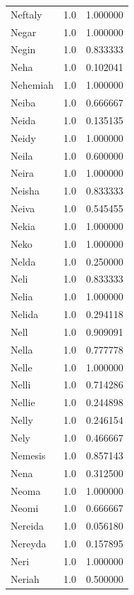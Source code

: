 \documentclass[
  letterpaper,
  DIV=11,
  numbers=noendperiod]{scrreprt}
\begin{document}
\begin{tabular}{lrr}
Neftaly         &   1.0 &   1.000000 \\
Negar           &   1.0 &   1.000000 \\
Negin           &   1.0 &   0.833333 \\
Neha            &   1.0 &   0.102041 \\
Nehemiah        &   1.0 &   1.000000 \\
Neiba           &   1.0 &   0.666667 \\
Neida           &   1.0 &   0.135135 \\
Neidy           &   1.0 &   1.000000 \\
Neila           &   1.0 &   0.600000 \\
Neira           &   1.0 &   1.000000 \\
Neisha          &   1.0 &   0.833333 \\
Neiva           &   1.0 &   0.545455 \\
Nekia           &   1.0 &   1.000000 \\
Neko            &   1.0 &   1.000000 \\
Nelda           &   1.0 &   0.250000 \\
Neli            &   1.0 &   0.833333 \\
Nelia           &   1.0 &   1.000000 \\
Nelida          &   1.0 &   0.294118 \\
Nell            &   1.0 &   0.909091 \\
Nella           &   1.0 &   0.777778 \\
Nelle           &   1.0 &   1.000000 \\
Nelli           &   1.0 &   0.714286 \\
Nellie          &   1.0 &   0.244898 \\
Nelly           &   1.0 &   0.246154 \\
Nely            &   1.0 &   0.466667 \\
Nemesis         &   1.0 &   0.857143 \\
Nena            &   1.0 &   0.312500 \\
Neoma           &   1.0 &   1.000000 \\
Neomi           &   1.0 &   0.666667 \\
Nereida         &   1.0 &   0.056180 \\
Nereyda         &   1.0 &   0.157895 \\
Neri            &   1.0 &   1.000000 \\
Neriah          &   1.0 &   0.500000 \\

\end{tabular}
\end{document}
